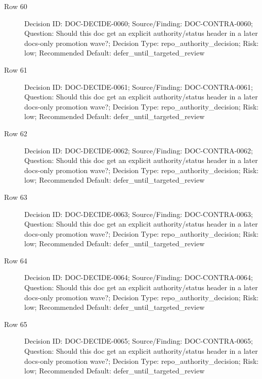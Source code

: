 \documentclass[9pt,a4paper,openany]{book}
\begin{document}
\begin{description}
\item[Row 60] Decision ID: DOC-\allowbreak{}DECIDE-\allowbreak{}0060; Source/\allowbreak{}Finding: DOC-\allowbreak{}CONTRA-\allowbreak{}0060; Question: Should this doc get an explicit authority/\allowbreak{}status header in a later docs-\allowbreak{}only promotion wave?; Decision Type: repo\_\allowbreak{}authority\_\allowbreak{}decision; Risk: low; Recommended Default: defer\_\allowbreak{}until\_\allowbreak{}targeted\_\allowbreak{}review
\item[Row 61] Decision ID: DOC-\allowbreak{}DECIDE-\allowbreak{}0061; Source/\allowbreak{}Finding: DOC-\allowbreak{}CONTRA-\allowbreak{}0061; Question: Should this doc get an explicit authority/\allowbreak{}status header in a later docs-\allowbreak{}only promotion wave?; Decision Type: repo\_\allowbreak{}authority\_\allowbreak{}decision; Risk: low; Recommended Default: defer\_\allowbreak{}until\_\allowbreak{}targeted\_\allowbreak{}review
\item[Row 62] Decision ID: DOC-\allowbreak{}DECIDE-\allowbreak{}0062; Source/\allowbreak{}Finding: DOC-\allowbreak{}CONTRA-\allowbreak{}0062; Question: Should this doc get an explicit authority/\allowbreak{}status header in a later docs-\allowbreak{}only promotion wave?; Decision Type: repo\_\allowbreak{}authority\_\allowbreak{}decision; Risk: low; Recommended Default: defer\_\allowbreak{}until\_\allowbreak{}targeted\_\allowbreak{}review
\item[Row 63] Decision ID: DOC-\allowbreak{}DECIDE-\allowbreak{}0063; Source/\allowbreak{}Finding: DOC-\allowbreak{}CONTRA-\allowbreak{}0063; Question: Should this doc get an explicit authority/\allowbreak{}status header in a later docs-\allowbreak{}only promotion wave?; Decision Type: repo\_\allowbreak{}authority\_\allowbreak{}decision; Risk: low; Recommended Default: defer\_\allowbreak{}until\_\allowbreak{}targeted\_\allowbreak{}review
\item[Row 64] Decision ID: DOC-\allowbreak{}DECIDE-\allowbreak{}0064; Source/\allowbreak{}Finding: DOC-\allowbreak{}CONTRA-\allowbreak{}0064; Question: Should this doc get an explicit authority/\allowbreak{}status header in a later docs-\allowbreak{}only promotion wave?; Decision Type: repo\_\allowbreak{}authority\_\allowbreak{}decision; Risk: low; Recommended Default: defer\_\allowbreak{}until\_\allowbreak{}targeted\_\allowbreak{}review
\item[Row 65] Decision ID: DOC-\allowbreak{}DECIDE-\allowbreak{}0065; Source/\allowbreak{}Finding: DOC-\allowbreak{}CONTRA-\allowbreak{}0065; Question: Should this doc get an explicit authority/\allowbreak{}status header in a later docs-\allowbreak{}only promotion wave?; Decision Type: repo\_\allowbreak{}authority\_\allowbreak{}decision; Risk: low; Recommended Default: defer\_\allowbreak{}until\_\allowbreak{}targeted\_\allowbreak{}review

\end{description}
\end{document}
